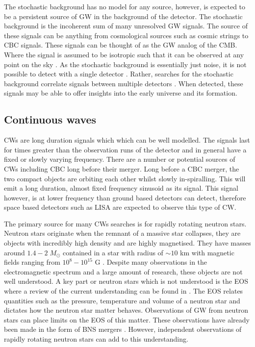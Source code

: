 The stochastic background has no model for any source, however, is expected to be a persistent source of \ac{GW} in the background of the detector. 
The stochastic background is the incoherent sum of many unresolved \ac{GW} signals.
The source of these signals can be anything from cosmological sources such as cosmic strings to \ac{CBC} signals.
These signals can be thought of as the \ac{GW} analog of the \ac{CMB}.
Where the signal is assumed to be isotropic such that it can be observed at any point on the sky \citep{christensen2018StochasticGravitational}. 
As the stochastic background is essentially just noise, it is not possible to detect with a single detector \citep{christensen2018StochasticGravitational}.
Rather, searches for the stochastic background correlate signals between multiple detectors \citep{romano2019SearchesStochastic,christensen2018StochasticGravitational}. 
When detected, these signals may be able to offer insights into the early universe and its formation.



\subsection{Continuous waves}

\acp{CW} are long duration signals which which can be well modelled.
The signals last for times greater than the observation runs of the detector and in general have a fixed or slowly varying frequency.
There are a number or potential sources of \acp{CW} including \ac{CBC} long before their merger.
Long before a \ac{CBC} merger, the two compact objects are orbiting each other whilst slowly in-spiralling.
This will emit a long duration, almost fixed frequency sinusoid as its signal.
This signal however, is at lower frequency than ground based detectors can detect, therefore space based detectors such as \ac{LISA} \citep{} are expected to observe this type of \ac{CW}.

The primary source for many \acp{CW} searches is for rapidly rotating neutron stars.
Neutron stars originate when the remnant of a massive star collapses, they are objects with incredibly high density and are highly magnetised.
They have masses around $1.4-2 \; M_{\odot}$ contained in a star with radius of $\sim 10$ km with magnetic fields ranging from $10^8 - 10^{15}$ G \citep{konar2017MagneticFields}.
Despite many observations in the electromagnetic spectrum and a large amount of research, these objects are not well understood.
A key part or neutron stars which is not understood is the \ac{EOS} where a review of the current understanding can be found in \cite{lattimer2016EquationState}.
The \ac{EOS} relates quantities such as the pressure, temperature and volume of a neutron star and dictates how the neutron star matter behaves.
Observations of \ac{GW} from neutron stars can place limits on the \ac{EOS} of this matter. 
These observations have already been made in the form of \ac{BNS} mergers \citep{abbott2017GW170817Observation}.
However, independent observations of rapidly rotating neutron stars can add to this understanding.

